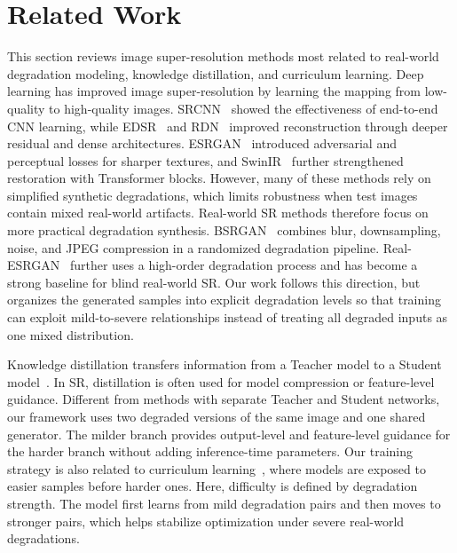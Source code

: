 \documentclass[runningheads]{llncs}
\begin{document}
\section{Related Work}
This section reviews image super-resolution methods most related to real-world degradation modeling, knowledge distillation, and curriculum learning.
Deep learning has improved image super-resolution by learning the mapping from low-quality to high-quality images. SRCNN~\cite{dong2014learning} showed the effectiveness of end-to-end CNN learning, while EDSR~\cite{lim2017enhanced} and RDN~\cite{zhang2018residualdensenetworkimage} improved reconstruction through deeper residual and dense architectures. ESRGAN~\cite{wang2018esrgan} introduced adversarial and perceptual losses for sharper textures, and SwinIR~\cite{liang2021swinir} further strengthened restoration with Transformer blocks. However, many of these methods rely on simplified synthetic degradations, which limits robustness when test images contain mixed real-world artifacts. Real-world SR methods therefore focus on more practical degradation synthesis. BSRGAN~\cite{zhang2021designing} combines blur, downsampling, noise, and JPEG compression in a randomized degradation pipeline. Real-ESRGAN~\cite{wang2021realesrgan} further uses a high-order degradation process and has become a strong baseline for blind real-world SR. Our work follows this direction, but organizes the generated samples into explicit degradation levels so that training can exploit mild-to-severe relationships instead of treating all degraded inputs as one mixed distribution.

Knowledge distillation transfers information from a Teacher model to a Student model~\cite{hinton2015distilling}. In SR, distillation is often used for model compression or feature-level guidance. Different from methods with separate Teacher and Student networks, our framework uses two degraded versions of the same image and one shared generator. The milder branch provides output-level and feature-level guidance for the harder branch without adding inference-time parameters. Our training strategy is also related to curriculum learning~\cite{Bengio09}, where models are exposed to easier samples before harder ones. Here, difficulty is defined by degradation strength. The model first learns from mild degradation pairs and then moves to stronger pairs, which helps stabilize optimization under severe real-world degradations.
\end{document}
